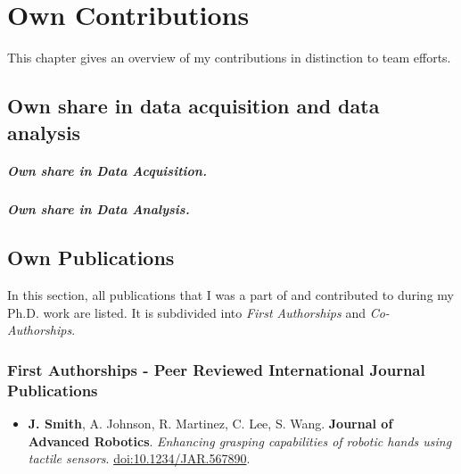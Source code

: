 \chapter*{Own Contributions}
\label{chap:contributions}

This chapter gives an overview of my contributions in distinction to team efforts.


\section*{Own share in data acquisition and data analysis}
{}
\label{sec:own-data-acquisition}

    
\lipsum[1]

\paragraph{Own share in Data Acquisition.}
\lipsum[1]  

\paragraph{Own share in Data Analysis.}
\lipsum[1] 
        
        

\section*{Own Publications}
\label{sec:own-publications}

In this section, all publications that I was a part of and contributed to during my Ph.D. work are listed. It is subdivided into \textit{First Authorships} and \textit{Co-Authorships}.
\hfill \break

\subsection*{First Authorships - Peer Reviewed International Journal Publications} \label{sec:publications:peer_reviewed_journal_first}

\begin{itemize}
    \item[] \textbf{J. Smith}, A. Johnson, R. Martinez, C. Lee, S. Wang. \textbf{Journal of Advanced Robotics}. \textit{Enhancing grasping capabilities of robotic hands using tactile sensors}. \url{doi:10.1234/JAR.567890}.
\end{itemize}

